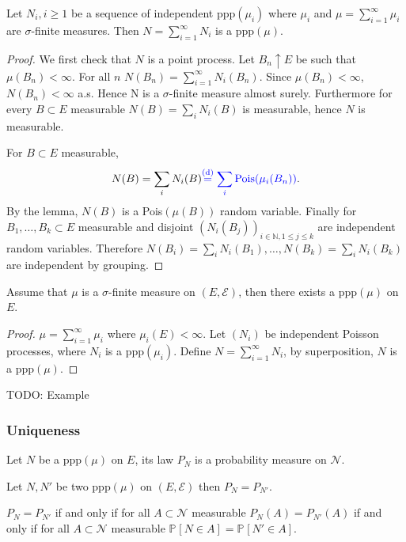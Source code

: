 \begin{theorem}[]
	Let $N_i, i\geq 1$ be a sequence of independent ppp$(\mu_i)$ where $\mu_i$ and $\mu = \sum_{i=1}^{\infty} \mu_i$ are $\sigma$-finite measures. Then $N= \sum_{i=1}^{\infty} N_i$ is a ppp$(\mu )$.
\end{theorem}
\begin{proof}
	We first check that $N$ is a point process. Let $B_n \uparrow E$ be such that $\mu (B_n)<\infty $. For all $n$ $N(B_n)=\sum_{i=1}^{\infty } N_i(B_n)$. Since $\mu(B_n)<\infty $, $N(B_n)<\infty $ a.s. Hence N is a $\sigma $-finite measure almost surely. Furthermore for every $B\subset E$ measurable $N(B) = \sum_{i}^{} N_i(B)$ is measurable, hence $N$ is measurable.

	For $B\subset E$ measurable, 
	\begin{align}
		N(B) = \sum_{i}^{} N_i(B){\color{blue} \stackrel{\textrm{(d)}}{=} \sum_{i}^{} \textrm{Pois}(\mu_i(B_n))}.
	\end{align}
	By the lemma, $N(B)$ is a Pois$(\mu (B))$ random variable. Finally for $B_1,\ldots , B_k \subset E$ measurable and disjoint $\left( N_i(B_j)\right)_{i \in \mathbb{N},1\leq j \leq k}$ are independent random variables. Therefore $N(B_i)=\sum_{i}^{} N_i(B_1) , \ldots , N(B_k) =\sum_{i}^{} N_i(B_k)$ are independent by grouping.
\end{proof}


\begin{cor}[]
Assume that $\mu$ is a $\sigma$-finite measure on $(E, \mathcal{E})$, then there exists a ppp$(\mu)$ on $E$.
\end{cor}
\begin{proof}
	$\mu = \sum_{i=1}^{\infty } \mu _i$ where $\mu _i(E) < \infty $. Let $(N_i)$ be independent Poisson processes, where $N_i$ is a ppp$(\mu _i)$. Define $N= \sum_{i=1}^{\infty } N_i$, by superposition, $N$ is a ppp$(\mu )$.
\end{proof}

{\color{blue}
TODO: Example}

\subsubsection{Uniqueness}
Let $N$ be a ppp$(\mu )$ on $E$, its law $P_N$ is a probability measure on $ \mathcal{N}$.

\begin{prop}[]
	Let $N, N'$ be two ppp$(\mu )$ on $(E, \mathcal{E})$ then $P_N = P_{N'}$.
\end{prop}
\begin{rmk}[]
	$P_N = P_{N'}$ if and only if for all $A \subset \mathcal{N}$ measurable $P_N(A) = P_{N'}(A)$ if and only if for all $A \subset \mathcal{N}$ measurable $\mathbb{P}_{} \left[ N \in A  \right]  = \mathbb{P}_{} \left[ N' \in A \right] $. 
\end{rmk}


